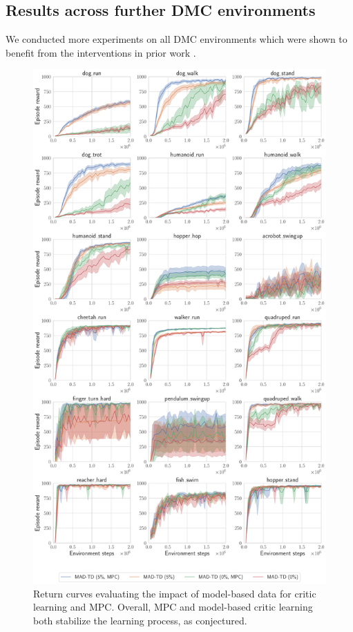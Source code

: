 \subsection{Results across further DMC environments}
\label{app:results_further}

We conducted more experiments on all DMC environments which were shown to benefit from the interventions in prior work \parencite{doro2023barrier,nauman2024bigger}.

\begin{figure}[h]
    \centering
    \includegraphics[width=0.8\linewidth]{figures/mad-td/model_impact.pdf}
    \caption{Return curves evaluating the impact of model-based data for critic learning and MPC. Overall, MPC and model-based critic learning both stabilize the learning process, as conjectured.}
    \label{fig:mad:all_model_impact}
\end{figure}

